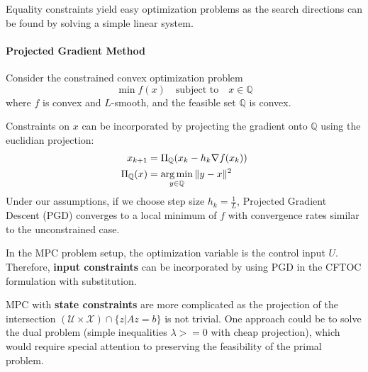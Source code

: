 \newpar{}

Equality constraints yield easy optimization problems as the search directions can be found by solving a simple linear system.

\paragraph{Projected Gradient Method}

Consider the constrained convex optimization problem
\begin{equation*}
    \min f(x) \quad \text{subject to} \quad x \in \mathbb{Q}
\end{equation*}
where $f$ is convex and $L$-smooth, and the feasible set $\mathbb{Q}$ is convex.
\newpar{}

Constraints on $x$ can be incorporated by projecting the gradient onto $\mathbb{Q}$ using the euclidian projection:
\begin{align*}
    x_{k+1}             & = \Pi_{\mathbb{Q}}(x_k - h_k \nabla f(x_k)) \\
    \Pi_{\mathbb{Q}}(x) & = \operatorname*{arg\,min}_{y\in\mathbb{Q}} \|y-x\|^2
\end{align*}
Under our assumptions, if we choose step size $h_k = \frac{1}{L}$, Projected Gradient Descent (PGD) converges to a local minimum of $f$ with convergence rates similar to the unconstrained case.

\newpar{}

In the MPC problem setup, the optimization variable is the control input $U$. Therefore, \textbf{input constraints} can be incorporated by using PGD in the CFTOC formulation with substitution.

\newpar{}
MPC with \textbf{state constraints} are more complicated as the projection of the intersection $(\mathcal{U}\times \mathcal{X}) \cap \{ z|Az=b\}$ is not trivial. One approach could be to solve the dual problem (simple inequalities $\lambda>=0$ with cheap projection), which would require special attention to preserving the feasibility of the primal problem.

